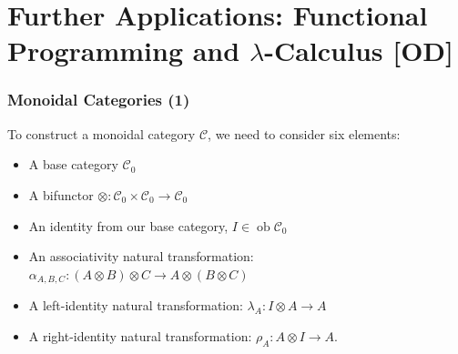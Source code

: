 \documentclass{beamer}
\numberwithin{figure}{section}
\DeclareMathOperator{\catobj}{ob}
\begin{document}
\section[Further Applications: Func. Prog. \protect\& Lambda-Calculus {[OD]}]%
        {Further Applications: Functional Programming and
        \texorpdfstring{$\lambda$}{Lambda}-Calculus [OD]}
\begin{frame}
        \frametitle{Monoidal Categories (1)}
        To construct a monoidal category $\mathcal{C}$, we need to consider six
        elements:
        \begin{itemize}[<+->]
                \item A base category $\mathcal{C}_0$
                \item A bifunctor $\otimes:\mathcal{C}_0 \times \mathcal{C}_0
                        \to \mathcal{C}_0$
                \item An identity from our base category, $I \in \catobj
                \mathcal{C}_0$
                \item An associativity natural transformation:
                        $\alpha_{A,B,C} : (A \otimes B) \otimes C \to A \otimes
                        (B \otimes C)$
                \item A left-identity natural transformation:
                        $\lambda_A: I \otimes A \to A$
                \item A right-identity natural transformation:
                        $\rho_A: A \otimes I \to A$.
        \end{itemize}
\end{frame}
\end{document}
